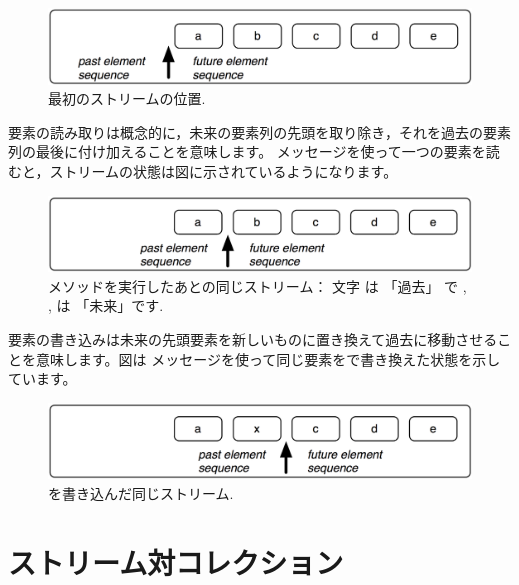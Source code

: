\documentclass[a4paper,10pt,twoside]{book}
\begin{document}
\begin{figure}[ht]
\centerline{\includegraphics[scale=0.5]{_abcdeStef}}
\caption{最初のストリームの位置.}
\vspace{.2in}
\end{figure}

要素の読み取りは概念的に，未来の要素列の先頭を取り除き，それを過去の要素列の最後に付け加えることを意味します。
メッセージを使って一つの要素を読むと，ストリームの状態は図に示されているようになります。

\begin{figure}[ht]
\centerline{\includegraphics[scale=0.5]{a_bcdeStef}}
\caption{メソッドを実行したあとの同じストリーム： 文字  は 「過去」 で , ,   は 「未来」です.}
\vspace{.2in}
\end{figure}

要素の書き込みは未来の先頭要素を新しいものに置き換えて過去に移動させることを意味します。図は メッセージを使って同じ要素をで書き換えた状態を示しています。


\begin{figure}[ht]
\centerline{\includegraphics[scale=0.5]{ax_cdeStef}}
\caption{を書き込んだ同じストリーム.}
\vspace{.2in}
\end{figure}

\section{ストリーム対コレクション}
\end{document}
